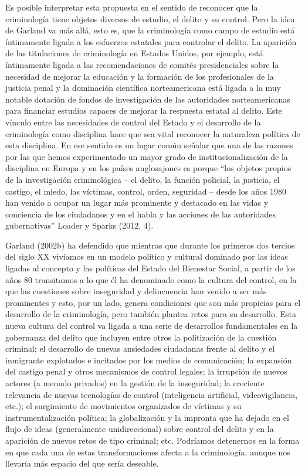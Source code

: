 \documentclass[
  spanish,
  letterpaper,
  DIV=11,
  numbers=noendperiod]{scrreprt}
\begin{document}
Es posible interpretar esta propuesta en el sentido de reconocer que la
criminología tiene objetos diversos de estudio, el delito y su control.
Pero la idea de Garland va más allá, esto es, que la criminología como
campo de estudio está íntimamente ligada a los esfuerzos estatales para
controlar el delito. La aparición de las titulaciones de criminología en
Estados Unidos, por ejemplo, está íntimamente ligada a las
recomendaciones de comités presidenciales sobre la necesidad de mejorar
la educación y la formación de los profesionales de la justicia penal y
la dominación científica norteamericana está ligada a la muy notable
dotación de fondos de investigación de las autoridades norteamericanas
para financiar estudios capaces de mejorar la respuesta estatal al
delito. Este vínculo entre las necesidades de control del Estado y el
desarrollo de la criminología como disciplina hace que sea vital
reconocer la naturaleza política de esta disciplina. En ese sentido es
un lugar común señalar que una de las razones por las que hemos
experimentado un mayor grado de institucionalización de la disciplina en
Europa y en los países anglosajones es porque ``los objetos propios de
la investigación criminológica -- el delito, la función policial, la
justicia, el castigo, el miedo, las víctimas, control, orden, seguridad
-- desde los años 1980 han venido a ocupar un lugar más prominente y
destacado en las vidas y conciencia de los ciudadanos y en el habla y
las acciones de las autoridades gubernativas'' Loader y Sparks (2012,
4).

Garland (2002b) ha defendido que mientras que durante los primeros dos
tercios del siglo XX vivíamos en un modelo político y cultural dominado
por las ideas ligadas al concepto y las políticas del Estado del
Bienestar Social, a partir de los años 80 transitamos a lo que él ha
denominado como la cultura del control, en la que las cuestiones sobre
inseguridad y delincuencia han venido a ser más prominentes y esto, por
un lado, genera condiciones que son más propicias para el desarrollo de
la criminología, pero también plantea retos para su desarrollo. Esta
nueva cultura del control va ligada a una serie de desarrollos
fundamentales en la gobernanza del delito que incluyen entre otros la
politización de la cuestión criminal; el desarrollo de nuevas ansiedades
ciudadanas frente al delito y el inmigrante explotados e incitados por
los medios de comunicación; la expansión del castigo penal y otros
mecanismos de control legales; la irrupción de nuevos actores (a menudo
privados) en la gestión de la inseguridad; la creciente relevancia de
nuevas tecnologías de control (inteligencia artificial, videovigilancia,
etc.); el surgimiento de movimientos organizados de víctimas y su
instrumentalización política; la globalización y la impronta que ha
dejado en el flujo de ideas (generalmente unidireccional) sobre control
del delito y en la aparición de nuevos retos de tipo criminal; etc.
Podríamos detenernos en la forma en que cada una de estas
transformaciones afecta a la criminología, aunque nos llevaría más
espacio del que sería deseable.
\end{document}
